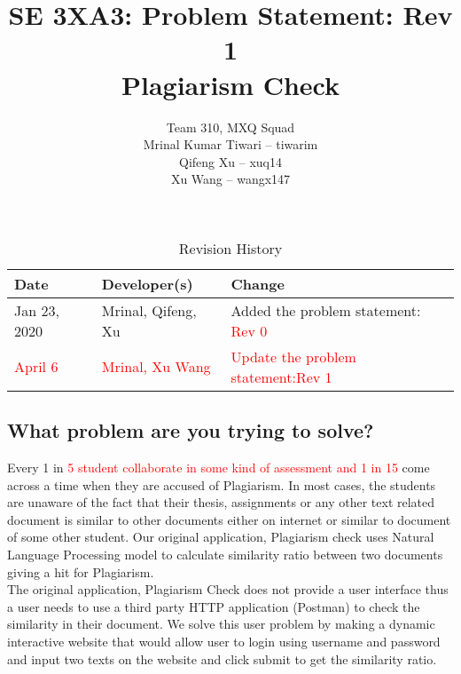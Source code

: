\documentclass{article}
\title{SE 3XA3: Problem Statement: Rev 1\\\textbf{Plagiarism Check}}
\author{Team 310, MXQ Squad
		\\ Mrinal Kumar Tiwari -- tiwarim
		\\ Qifeng Xu -- xuq14
		\\ Xu Wang --  wangx147
}
\date{}
\begin{document}
\maketitle
\newpage
\begin{table}[hp]
\caption{Revision History} \label{TblRevisionHistory}
\begin{tabularx}{\textwidth}{llX}
\toprule
\textbf{Date} & \textbf{Developer(s)} & \textbf{Change}\\
\midrule
Jan 23, 2020 & Mrinal, Qifeng, Xu & Added the problem statement: \textcolor{red}{Rev 0} \\
\textcolor{red}{April 6} & \textcolor{red}{Mrinal, Xu Wang}  & \textcolor{red}{Update the problem statement:Rev 1} \\
\bottomrule
\end{tabularx}
\end{table}

\newpage

\maketitle

\subsection*{What problem are you trying to solve?}
\newcommand*\apos{\textsc{\char13}}
Every 1 in \textcolor{red}{ 5 student collaborate in some kind of assessment and 1 in 15 }  come across a time when they are accused of Plagiarism. In most cases, the students are unaware of the fact that their thesis, assignments or any other text related document is similar to other documents either on internet or similar to document of some other student. Our original application, Plagiarism check uses Natural Language Processing model to calculate similarity ratio between two documents giving a hit for Plagiarism. \\

The original application, Plagiarism Check does not provide a user interface thus a user needs to use a third party HTTP application (Postman) to check the similarity in their document. We solve this user problem by making a dynamic interactive website that would allow user to login using username and password and input two texts on the website and click submit to get the similarity ratio.
\end{document}
